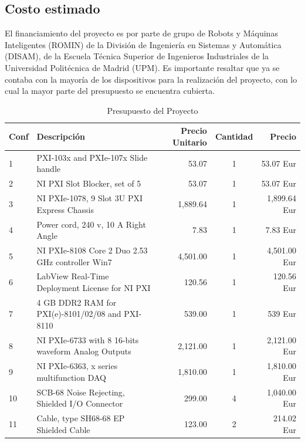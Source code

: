 \subsection{Costo estimado}
El financiamiento del proyecto es por parte de grupo de Robots y Máquinas Inteligentes (\textsc{ROMIN}) de la División de Ingeniería en Sistemas y Automática (\textsc{DISAM}), de la Escuela Técnica Superior de Ingenieros Industriales de la Universidad Politécnica de Madrid (\textsc{UPM}). Es importante resaltar que ya se contaba con la mayoría de los dispositivos para la realización del proyecto, con lo cual la mayor parte del presupuesto se encuentra cubierta.




\begin{table}
  \centering
  \caption{Presupuesto del Proyecto}
  \begin{tabular}{l l r c r}
 \hline
 \hline
Conf      & Descripción    							& Precio Unitario & Cantidad & Precio  \\
 \hline
 \hline
 1        & PXI-103x and PXIe-107x Slide handle         		 & 53.07 		    &  1         & 53.07 Eur\\
 2        & NI PXI Slot Blocker, set of 5               		 & 53.07	            &  1         & 53.07 Eur\\
 3        & NI PXIe-1078, 9 Slot 3U PXI Express Chassis 		 & 1,889.64         &  1         & 1,899.64 Eur\\
 4        & Power cord, 240 v, 10 A Right Angle         		 & 7.83             &  1         & 7.83 Eur\\
 5        & NI PXIe-8108 Core 2 Duo 2.53 GHz controller Win7   & 4,501.00         & 1          & 4,501.00 Eur\\
 6        & LabView Real-Time Deployment License for NI PXI    & 120.56           &  1        & 120.56 Eur\\
 7        & 4 GB DDR2 RAM for PXI(e)-8101/02/08 and PXI-8110   & 539.00              &  1       & 539 Eur\\
 8        & NI PXIe-6733 with 8 16-bits waveform Analog Outputs & 2,121.00        & 1         & 2,121.00 Eur\\
 9       & NI PXIe-6363, x series multifunction DAQ            & 1,810.00       &  1         & 1,810.00 Eur\\
 10       & SCB-68 Noise Rejecting, Shielded I/O Connector     & 299.00         & 4          & 1,040.00 Eur\\
 11       & Cable, type SH68-68 EP Shielded Cable              & 123.00  			&	2     & 214.02 Eur\\

\end{tabular}
\end{table}
